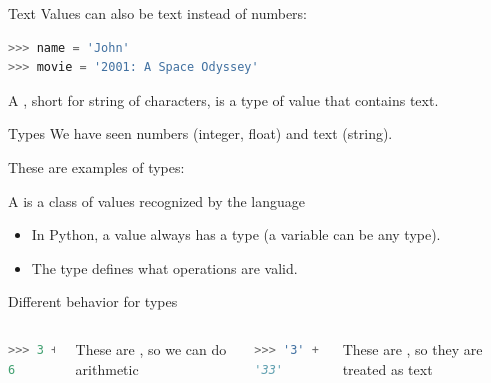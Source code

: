 \documentclass[aspectratio=169,usenames,dvipsnames]{beamer}
\begin{document}
\begin{frame}[fragile]{Text}
Values can also be text instead of numbers:
\begin{lstlisting}[language=python]
>>> name = 'John'
>>> movie = '2001: A Space Odyssey'
\end{lstlisting}

\pause
    \begin{definition}
        A , short for string of characters,
        is a type of value that contains text.
    \end{definition}
\end{frame}

\begin{frame}{Types}
    We have seen numbers (integer, float) and text (string).

    These are examples of types:

    \begin{definition}
        A  is a class of values recognized by the language
    \end{definition}
    
    \pause
    \begin{itemize}
        \item In Python, a value always has a type (a variable can be any type).
        \item The type defines what operations are valid.
    \end{itemize}
\end{frame}

\begin{frame}[fragile]{Different behavior for types}
    \begin{columns}
\begin{lstlisting}[language=python]
>>> 3 + 3
6
\end{lstlisting}

These are , so we can do arithmetic
\begin{lstlisting}[language=python]
>>> '3' + '3'
'33'
\end{lstlisting}

These are , so they are treated as text
    \end{columns}
\end{frame}
\end{document}
